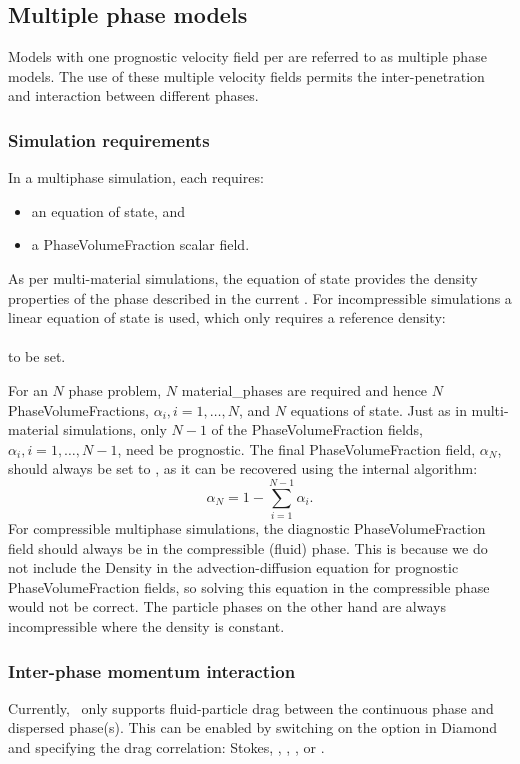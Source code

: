 \subsection{Multiple phase models}
Models with one prognostic velocity field per  are referred to as multiple phase models. The use of these multiple velocity fields permits the inter-penetration and interaction between different phases.

\subsubsection{Simulation requirements}
In a multiphase simulation, each  requires:
\begin{itemize}
 \item an equation of state, and
 \item a PhaseVolumeFraction scalar field.
\end{itemize}

As per multi-material simulations, the equation of state provides the density properties of the phase described in the current . For incompressible simulations a linear equation of state is used, which only requires a reference density:\\
\\
to be set.

For an $N$ phase problem, $N$ material\_phases are required and hence $N$ PhaseVolumeFractions, $\alpha_i, i = 1, \ldots, N$, and $N$ equations of state. Just as in multi-material simulations, only $N-1$ of the PhaseVolumeFraction fields, $\alpha_i, i = 1, \ldots, N-1$, need be prognostic. The final PhaseVolumeFraction field, $\alpha_N$, should always be set to , as it can be recovered using the internal algorithm:
\begin{equation}
\alpha_N = 1 - \sum_{i=1}^{N-1}\alpha_i\textrm{.}
\end{equation}
For compressible multiphase simulations, the diagnostic PhaseVolumeFraction field should always be in the compressible (fluid) phase. This is because we do not include the Density in the advection-diffusion equation for prognostic PhaseVolumeFraction fields, so solving this equation in the compressible phase would not be correct. The particle phases on the other hand are always incompressible where the density is constant.

\subsubsection{Inter-phase momentum interaction}
Currently, \fluidity\ only supports fluid-particle drag between the continuous phase and dispersed phase(s). This can be enabled by switching on the  option in Diamond and specifying the drag correlation: Stokes, \cite{wen_yu_1966}, \cite{ergun1952}, \cite{schiller1935drag}, \cite{lain1999experimental} or \cite{lain2002modelling}.

